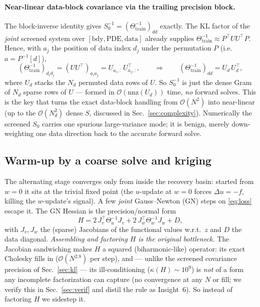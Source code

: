 \documentclass[11pt]{article}
\newcommand{\T}{^{\!\top}}
\newcommand{\inv}{^{-1}}
\newcommand{\Th}{\Theta}
\newcommand{\Thtr}{\Th_{\mathrm{train}}}
\newcommand{\bigO}{\mathcal{O}}
\begin{document}
\paragraph{Near-linear data-block covariance via the trailing precision block.}
The block-inverse identity gives $S_0\inv=(\Thtr\inv)_{dd}$ exactly. The KL
factor of the \emph{joint} screened system over $[\text{bdy},\text{PDE},
\text{data}]$ already supplies $\Thtr\inv\approx P\T U U\T P$. Hence, with
$a_j$ the position of data index $d_j$ under the permutation $P$ (i.e.\
$a=P\inv[d]$),
\begin{equation}\label{eq:trailing}
(\Thtr\inv)_{d_i d_j} = (U U\T)_{a_i a_j} = U_{a_i,:}\,U_{a_j,:}\T,
\qquad\Longrightarrow\qquad
(\Thtr\inv)_{dd} = U_d\,U_d\T,
\end{equation}
where $U_d$ stacks the $N_d$ permuted data rows of $U$. So $S_0\inv$ is just the
dense Gram of $N_d$ sparse rows of $U$ --- formed in $\bigO(\mathrm{nnz}(U_d))$
time, \emph{no} forward solves. This is the key that turns the exact data-block
handling from $\bigO(N^2)$ into near-linear (up to the $\bigO(N_d^2)$ dense $S$,
discussed in Sec.~\ref{sec:complexity}). Numerically the screened $S_0$ carries
one spurious large-variance mode; it is benign, merely down-weighting one data
direction back to the accurate forward solve.

\subsection{Warm-up by a coarse solve and kriging}\label{sec:warmup}

The alternating stage converges only from inside the recovery basin: started
from $w=0$ it sits at the trivial fixed point (the $u$-update at $w=0$ forces
$\Delta u=-f$, killing the $w$-update's signal). A few \emph{joint}
Gauss--Newton (GN) steps on \eqref{eq:loss} escape it. The GN Hessian is the
precision/normal form
\begin{equation}\label{eq:H}
H = 2\,J_v\T \Th_u\inv J_v + 2\,J_w\T \Th_w\inv J_w + D,
\end{equation}
with $J_v,J_w$ the (sparse) Jacobians of the functional values w.r.t.\ $z$ and
$D$ the data diagonal. \emph{Assembling and factoring $H$ is the original
bottleneck.} The Jacobian sandwiching makes $H$ a squared (biharmonic-like)
operator: its exact Cholesky fills in ($\bigO(N^{2.8})$ per step), and --- unlike
the screened covariance precision of Sec.~\ref{sec:kl} --- its ill-conditioning
($\kappa(H)\sim10^{9}$) is \emph{not} of a form any incomplete factorization can
capture (no convergence at any $N$ or fill; we verify this in
Sec.~\ref{sec:verif} and distil the rule as Insight~6). So instead of factoring
$H$ we sidestep it.
\end{document}
